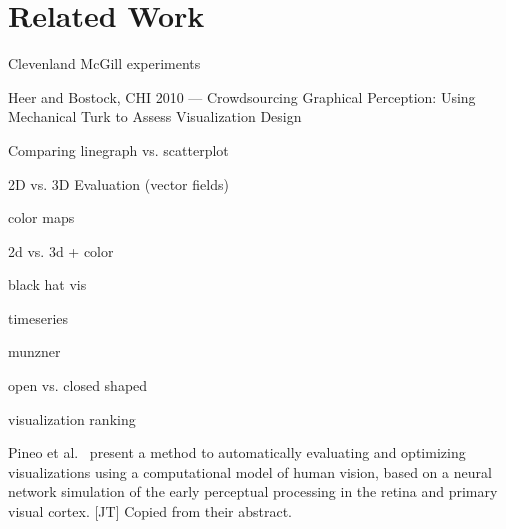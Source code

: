 \section{Related Work}

\cite{cleveland_mcgill} Clevenland McGill experiments

\cite{HeerBostock2010} Heer and Bostock, CHI 2010 --- Crowdsourcing Graphical Perception: Using Mechanical Turk to Assess Visualization Design


\cite{Wang_linegraph_vs_scatterplot} Comparing linegraph vs. scatterplot


\cite{mckenzie_2d_3d} \cite{forsberg2009comparing_3d_vector} \cite{laidlaw_2d_vector} 2D vs. 3D Evaluation (vector fields)


\cite{kindlmann2002color} \cite{rheingans1992color} \cite{ware1988color} \cite{Rogowitz2001_colormaps} color maps

2d vs. 3d + color \cite{borkin2011arteries}

black hat vis \cite{heer2017blackhat}

timeseries \cite{herr2009timeseries}

munzner \cite{munzner2015visualization}

open vs. closed shaped \cite{open_vs_closed_shapes}

visualization ranking \cite{harrison2014_webers_law_rank}

Pineo et al.~\cite{Pineo2012_computational_perception} present a method to automatically evaluating and optimizing visualizations using a computational model of human vision, based on a neural network simulation of the early perceptual processing in the retina and primary visual cortex. [JT] Copied from their abstract.

